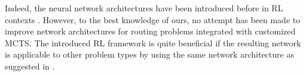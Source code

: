 \documentclass{article}
\begin{document}
Indeed, the neural network architectures have been introduced before in RL contexts \cite{kool2018attention, daiLearningCombinatorialOptimization2018, kwonPOMOPolicyOptimization2021}. However, to the best knowledge of ours, no attempt has been made to improve network architectures for routing problems integrated with customized MCTS.
The introduced RL framework is quite beneficial if the resulting network is applicable to other problem types by using the same network architecture as suggested in \cite{vinyalsPointerNetworks2017, kwonPOMOPolicyOptimization2021, kwonMatNet}.
\end{document}
